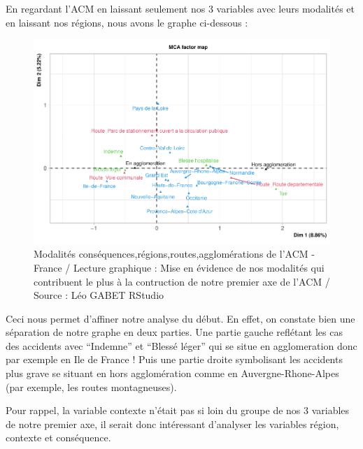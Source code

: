 \documentclass[french,]{compterendu}
\theoremstyle{urcastyle}
\theoremstyle{remark}
\begin{document}
En regardant l'ACM en laissant seulement nos 3 variables avec leurs modalités et en laissant nos régions, nous avons le graphe ci-dessous :

\begin{figure}[H]

{\centering \includegraphics[width=0.9\linewidth]{Rapport_ADD_LEO-GABET_files/figure-latex/acm1modagraphe-1} 

}

\caption{Modalités conséquences,régions,routes,agglomérations de l'ACM - France / Lecture graphique : Mise en évidence de nos modalités qui contribuent le plus à la contruction de notre premier axe de l'ACM / Source : Léo GABET RStudio}\label{fig:acm1modagraphe}
\end{figure}

Ceci nous permet d'affiner notre analyse du début. En effet, on constate bien une séparation de notre graphe en deux parties. Une partie gauche reflétant les cas des accidents avec ``Indemne'' et ``Blessé léger'' qui se situe en agglomeration donc par exemple en Ile de France ! Puis une partie droite symbolisant les accidents plus grave se situant en hors agglomération comme en Auvergne-Rhone-Alpes (par exemple, les routes montagneuses).

Pour rappel, la variable contexte n'était pas si loin du groupe de nos 3 variables de notre premier axe, il serait donc intéressant d'analyser les variables région, contexte et conséquence.
\end{document}
